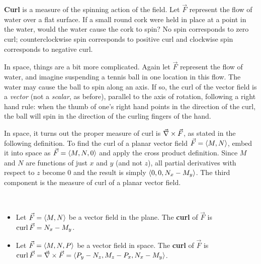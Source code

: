 
\textbf{Curl} is a measure of the spinning action of the field. Let $\vec F$ represent the flow of water over a flat surface. If a small round cork were held in place at a point in the water, would the water cause the cork to spin? No spin corresponds to zero curl; counterclockwise spin corresponds to positive curl and clockwise spin corresponds to negative curl. 

In space, things are a bit more complicated. Again let $\vec F$ represent the flow of water, and imagine suspending a tennis ball in one location in this flow. The water may cause the ball to spin along an axis. If so, the curl of the vector field is a \emph{vector} (not a \emph{scalar}, as before), parallel to the axis of rotation, following a right hand rule: when the thumb of one's right hand points in the direction of the curl, the ball will spin in the direction of the curling fingers of the hand.

In space, it turns out the proper measure of curl is $\vec\nabla \times \vec F$, as stated in the following definition. To find the curl of a planar vector field $\vec F =\left\langle M,N\right\rangle$, embed it into space as $\vec F =\left\langle M, N, 0\right\rangle$ and apply the cross product definition. Since $M$ and $N$ are functions of just $x$ and $y$ (and not $z$), all partial derivatives with respect to $z$ become 0 and the result is simply $\left\langle 0,0,N_x-M_y\right\rangle$. The third component is the measure of curl of a planar vector field. 

\begin{definition}\label{def:curl}%
\mbox{}\\[-2\baselineskip]\parbox[t]{\linewidth}{\begin{itemize}
	\item Let $\vec F =\left\langle M,N\right\rangle$ be a vector field in the plane. The \textbf{curl} of $\vec F$ is $\operatorname{curl} \vec F = N_x - M_y$.
	\item Let $\vec F =\left\langle M,N,P\right\rangle$ be a vector field in space. The \textbf{curl} of $\vec F$ is $\operatorname{curl} \vec F = \vec\nabla \times \vec F =\left\langle P_y-N_z,M_z-P_x,N_x - M_y\right\rangle$.
\end{itemize}}
\end{definition}

